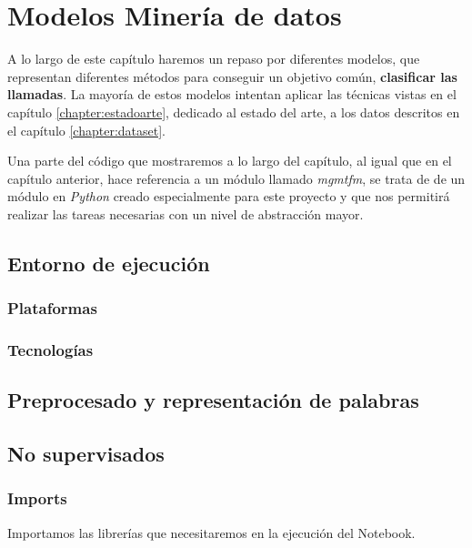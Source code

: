 \chapter{Modelos Minería de datos}
\label{chapter:modelos}

A lo largo de este capítulo haremos un repaso por diferentes modelos, que representan diferentes métodos para conseguir un objetivo común, \textbf{clasificar las llamadas}. La mayoría de estos modelos intentan aplicar las técnicas vistas en el capítulo \ref{chapter:estadoarte}, dedicado al estado del arte, a los datos descritos en el capítulo \ref{chapter:dataset}.

Una parte del código que mostraremos a lo largo del capítulo, al igual que en el capítulo anterior, hace referencia a un módulo llamado \textit{mgmtfm}, se trata de de un módulo en \textit{Python} creado especialmente para este proyecto y que nos permitirá realizar las tareas necesarias con un nivel de abstracción mayor. 




\section{Entorno de ejecución}




\subsection{Plataformas}



\subsection{Tecnologías}


\section{Preprocesado y representación de palabras}


\section{No supervisados}

\subsection{Imports}

    Importamos las librerías que necesitaremos en la ejecución del Notebook.

